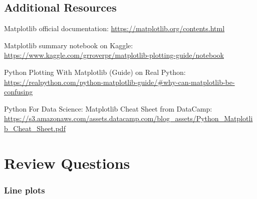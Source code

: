 \documentclass{book}
\begin{document}
    




    
        \hypertarget{additional-resources}{%
\subsection{Additional Resources}\label{additional-resources}}
    




    
        Matplotlib official documentation:
\url{https://matplotlib.org/contents.html}

Matplotlib summary notebook on Kaggle:
\url{https://www.kaggle.com/grroverpr/matplotlib-plotting-guide/notebook}

Python Plotting With Matplotlib (Guide) on Real Python:
\url{https://realpython.com/python-matplotlib-guide/\#why-can-matplotlib-be-confusing}

Python For Data Science: Matplotlib Cheat Sheet from DataCamp:
\url{https://s3.amazonaws.com/assets.datacamp.com/blog_assets/Python_Matplotlib_Cheat_Sheet.pdf}
    




    
        \hypertarget{review-questions}{%
\section{Review Questions}\label{review-questions}}
    




    
        \hypertarget{line-plots}{%
\subsubsection{Line plots}\label{line-plots}}
    
\end{document}
